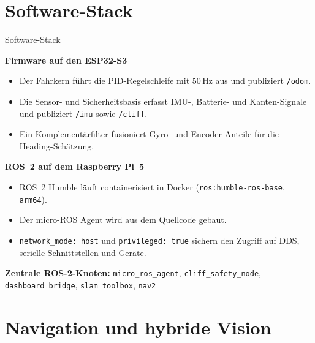 \documentclass[aspectratio=169]{beamer}
\begin{document}
\section{Software-Stack}

\begin{frame}{Software-Stack}

  \textbf{Firmware auf den ESP32-S3}
  \begin{itemize}
    \item Der Fahrkern führt die PID-Regelschleife mit $50\,\mathrm{Hz}$
          aus und publiziert \texttt{/odom}.
    \item Die Sensor- und Sicherheitsbasis erfasst IMU-, Batterie- und
          Kanten-Signale und publiziert \texttt{/imu} sowie \texttt{/cliff}.
    \item Ein Komplementärfilter fusioniert Gyro- und Encoder-Anteile
          für die Heading-Schätzung.
  \end{itemize}

  \vspace{0.5em}
  \textbf{ROS~2 auf dem Raspberry Pi~5}
  \begin{itemize}
    \item ROS~2 Humble läuft containerisiert in Docker
          (\texttt{ros:humble-ros-base}, \texttt{arm64}).
    \item Der micro-ROS Agent wird aus dem Quellcode gebaut.
    \item \texttt{network\_mode: host} und \texttt{privileged: true}
          sichern den Zugriff auf DDS, serielle Schnittstellen und Geräte.
  \end{itemize}

  \vspace{0.5em}
  \textbf{Zentrale ROS-2-Knoten:}
  \texttt{micro\_ros\_agent},
  \texttt{cliff\_safety\_node},
  \texttt{dashboard\_bridge},
  \texttt{slam\_toolbox},
  \texttt{nav2}

\end{frame}

\section{Navigation und hybride Vision}
\end{document}
